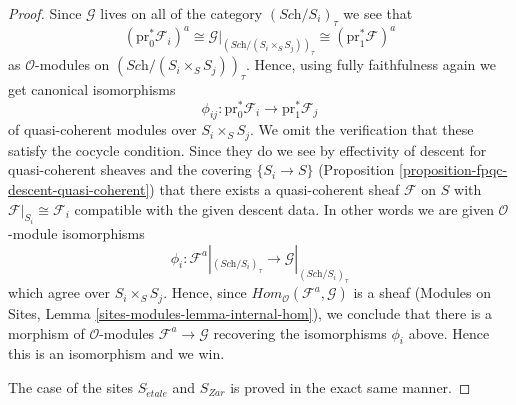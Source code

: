 \begin{proof}
\medskip\noindent
Since $\mathcal{G}$ lives on all of the category
$(\textit{Sch}/S_i)_\tau$ we see that
$$
(\text{pr}_0^*\mathcal{F}_i)^a
\cong
\mathcal{G}|_{(\textit{Sch}/(S_i \times_S S_j))_\tau}
\cong
(\text{pr}_1^*\mathcal{F})^a
$$
as $\mathcal{O}$-modules on $(\textit{Sch}/(S_i \times_S S_j))_\tau$.
Hence, using fully faithfulness again we get canonical isomorphisms
$$
\phi_{ij} :
\text{pr}_0^*\mathcal{F}_i
\longrightarrow
\text{pr}_1^*\mathcal{F}_j
$$
of quasi-coherent modules over $S_i \times_S S_j$. We omit the verification
that these satisfy the cocycle condition. Since they do we see by
effectivity of descent for quasi-coherent sheaves and the covering
$\{S_i \to S\}$ (Proposition \ref{proposition-fpqc-descent-quasi-coherent})
that there exists a quasi-coherent sheaf $\mathcal{F}$ on $S$
with $\mathcal{F}|_{S_i} \cong \mathcal{F}_i$ compatible
with the given descent data. In other words we are given
$\mathcal{O}$-module isomorphisms
$$
\phi_i :
\mathcal{F}^a|_{(\textit{Sch}/S_i)_\tau}
\longrightarrow
\mathcal{G}|_{(\textit{Sch}/S_i)_\tau}
$$
which agree over $S_i \times_S S_j$. Hence, since
$\textit{Hom}_{\mathcal{O}}(\mathcal{F}^a, \mathcal{G})$ is
a sheaf (Modules on Sites, Lemma \ref{sites-modules-lemma-internal-hom}),
we conclude that
there is a morphism of $\mathcal{O}$-modules $\mathcal{F}^a \to \mathcal{G}$
recovering the isomorphisms $\phi_i$ above. Hence this is an isomorphism
and we win.

\medskip\noindent
The case of the sites $S_{\acute{e}tale}$ and $S_{Zar}$ is proved in the
exact same manner.
\end{proof}

